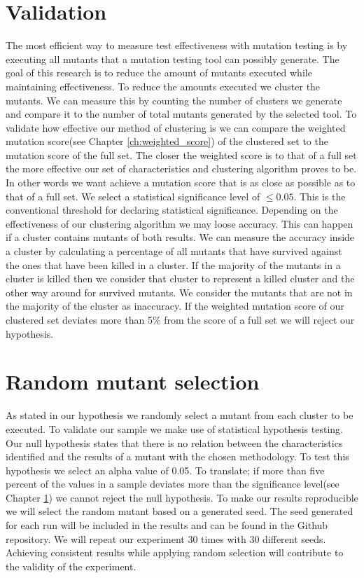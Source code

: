 \documentclass[../main]{subfiles}
\begin{document}
\section{Validation}
\label{ch:exp1_validation}
The most efficient way to measure test effectiveness with mutation testing is by executing all mutants that a mutation testing tool can possibly generate.
The goal of this research is to reduce the amount of mutants executed while maintaining effectiveness.
To reduce the amounts executed we cluster the mutants. 
We can measure this by counting the number of clusters we generate and compare it to the number of total mutants generated by the selected tool.
\newline
To validate how effective our method of clustering is we can compare the weighted mutation score(see Chapter \ref{ch:weighted_score}) of the clustered set to the mutation score of the full set.
The closer the weighted score is to that of a full set the more effective our set of characteristics and clustering algorithm proves to be.
In other words we want achieve a mutation score that is as close as possible as to that of a full set.
We select a statistical significance level of $\leq 0.05$.
This is the conventional threshold for declaring statistical significance\cite{Kirk1996PracticalCome}.
\newline
Depending on the effectiveness of our clustering algorithm we may loose accuracy.
This can happen if a cluster contains mutants of both results. 
We can measure the accuracy inside a cluster by calculating a percentage of all mutants that have survived against the ones that have been killed in a cluster.
If the majority of the mutants in a cluster is killed then we consider that cluster to represent a killed cluster and the other way around for survived mutants.
We consider the mutants that are not in the majority of the cluster as inaccuracy.
\newline
If the weighted mutation score of our clustered set deviates more than 5\% from the score of a full set we will reject our hypothesis.

\section{Random mutant selection}
\label{ch:mutant_selection}
As stated in our hypothesis we randomly select a mutant from each cluster to be executed.
To validate our sample we make use of statistical hypothesis testing\cite{Emmert-Streib2019UnderstandingInference}. Our null hypothesis states that there is no relation between the characteristics identified and the results of a mutant with the chosen methodology.
To test this hypothesis we select an alpha value of 0.05.
To translate; if more than five percent of the values in a sample deviates more than the significance level(see Chapter \ref{ch:exp1_validation}) we cannot reject the null hypothesis.
To make our results reproducible we will select the random mutant based on a generated seed.
The seed generated for each run will be included in the results and can be found in the Github repository\cite{rbasarat-repo}.
We will repeat our experiment 30 times with 30 different seeds.
Achieving consistent results while applying random selection will contribute to the validity of the experiment.
\end{document}

